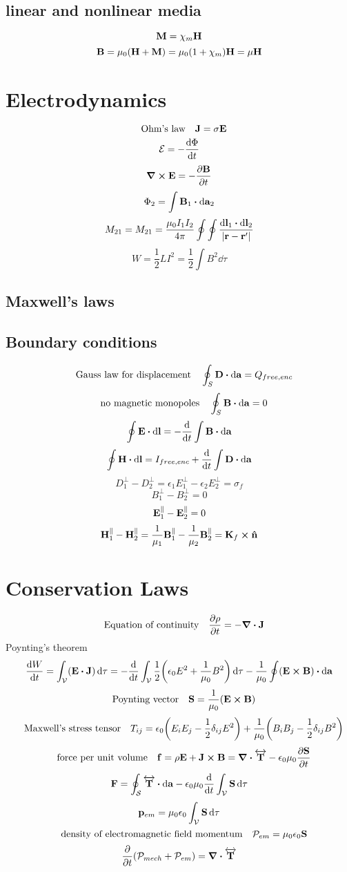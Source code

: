 \documentclass[12pt]{article}
\begin{document}
\subsection*{linear and nonlinear media}
\[\vb{M}=\chi_m\vb{H}\]
\[\vb{B}=\mu_0(\vb{H}+\vb{M})=\mu_0(1+\chi_m)\vb{H}=\mu\vb{H}\]
\section{Electrodynamics}
\[\qq{Ohm's law} \vb{J}=\sigma\vb{E}\]
\[\mathcal{E}=-\dv{\Phi}{t}\]
\[\curl{\vb{E}}=-\pdv{\vb{B}}{t}\]
\[\Phi_2=\int\vb{B}_1\vdot\dd{\vb{a}_2}\]
\[M_{21}=M_{21}=\frac{\mu_0I_1I_2}{4\pi}\oint\oint\frac{\dd{\vb{l}_1}\vdot\dd{\vb{l}_2}}{|\vb{r}-\vb{r}' |}\]
\[W=\frac{1}{2}LI^2=\frac{1}{2}\int B^2\dd{\tau}\]
\subsection*{Maxwell's laws}

\subsection*{Boundary conditions}
\[\qq{Gauss law for displacement}\oint_{S}\vb{D}\vdot\dd{\vb{a}}=Q_{free,enc}\]
\[\qq{no magnetic monopoles}\oint_{S}\vb{B}\vdot\dd{\vb{a}}=0\]
\[\oint\vb{E}\vdot\dd{\vb{l}}=-\dv{t}\int\vb{B}\vdot\dd{\vb{a}}\]
\[\oint\vb{H}\vdot\dd{\vb{l}}=I_{free,enc}+\dv{t}\int\vb{D}\vdot\dd{\vb{a}}\]
\[D_{1}^{\perp}-D_{2}^{\perp}=\epsilon_1E_{1}^{\perp}-\epsilon_2E_{2}^{\perp}=\sigma_f\]
\[B_{1}^{\perp}-B_{2}^{\perp}=0\]
\[\vb{E}_{1}^{\parallel}-\vb{E}_{2}^{\parallel}=0\]
\[\vb{H}_{1}^{\parallel}-\vb{H}_{2}^{\parallel}=\frac{1}{\mu_1}\vb{B}_{1}^{\parallel}-\frac{1}{\mu_2}\vb{B}_{2}^{\parallel}=\vb{K}_f\cp\vu{n}\]

\section{Conservation Laws}
\[\qq{Equation of continuity} \pdv{\rho}{t}=-\div{\vb{J}}\]
Poynting's theorem
\[\dv{W}{t}=\int_{\mathcal{V}}(\vb{E}\vdot{\vb{J}})\dd{\tau}=-\dv{t}\int_{\mathcal{V}}\frac{1}{2}\qty(\epsilon_0E^2+\frac{1}{\mu_0}B^2)\dd{\tau}-\frac{1}{\mu_0}\oint(\vb{E}\cp\vb{B})\vdot\dd{\vb{a}}\]
\[\qq{Poynting vector}\vb{S}=\frac{1}{\mu_0}(\vb{E}\cp\vb{B})\]
\[\qq{Maxwell's stress tensor} T_{ij}=\epsilon_0\qty(E_iE_j-\frac{1}{2}\delta_{ij}E^2)+\frac{1}{\mu_0}\qty(B_iB_j-\frac{1}{2}\delta_{ij}B^2)\]
\[\qq{force per unit volume} \vb{f}=\rho\vb{E}+\vb{J}\cp\vb{B}=\div{\overleftrightarrow{\vb{T}}}-\epsilon_0\mu_0\pdv{\vb{S}}{t}\]
\[\vb{F}=\oint_{\mathcal{S}}\overleftrightarrow{\vb{T}}\vdot\dd{\vb{a}}-\epsilon_0\mu_0\dv{t}\int_{\mathcal{V}}\vb{S}\dd{\tau}\]
\[\vb{p}_{em}=\mu_0\epsilon_0\int_{\mathcal{V}}\vb{S}\dd{\tau}\]
\[\qq{density of electromagnetic field momentum}\mathcal{P}_{em}=\mu_0\epsilon_0\vb{S}\]
\[\pdv{t}(\mathcal{P}_{mech}+\mathcal{P}_{em})=\div{\overleftrightarrow{\vb{T}}}\]
\end{document}
